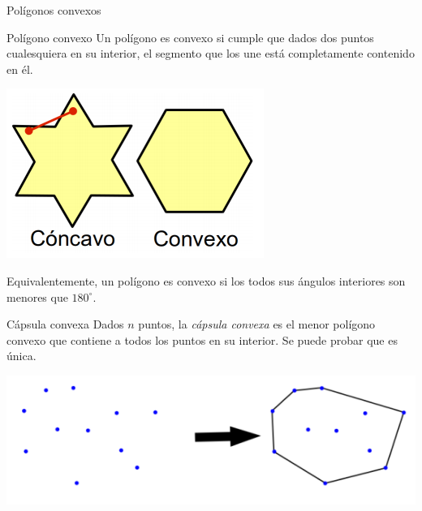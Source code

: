 \documentclass[compress]{beamer}
\newcommand{\bigpause}{\bigskip \pause}
\begin{document}
\begin{frame}{Pol\'igonos convexos}
\begin{block}{Pol\'igono convexo}
Un pol\'igono es convexo si cumple que dados dos puntos cualesquiera en su interior, el segmento que los une est\'a completamente contenido en \'el.
\end{block}

\begin{center}
\includegraphics[scale=0.4]{images/convexo.png}
\end{center}

Equivalentemente, un pol\'igono es convexo si los todos sus \'angulos interiores son menores que $180^\circ$.

\bigpause
{}
\end{frame}


\begin{frame}
\begin{block}{C\'apsula convexa}
Dados $n$ puntos, la \emph{c\'apsula convexa} es el menor pol\'igono convexo que contiene a todos los puntos 
en su interior. Se puede probar que es \'unica.
\end{block}

\begin{center}
\includegraphics[scale=0.5]{images/convex_hull.png}
\end{center}

\end{frame}
\end{document}
